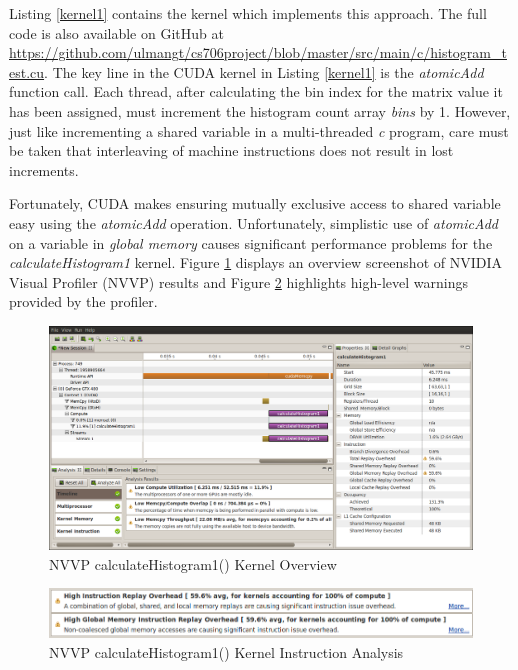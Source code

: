 \documentclass{article}
\begin{document}
Listing \ref{kernel1} contains the kernel which implements this approach. The full code is also available on GitHub at \url{https://github.com/ulmangt/cs706project/blob/master/src/main/c/histogram_test.cu}. The key line in the CUDA kernel in Listing \ref{kernel1} is the \emph{atomicAdd} function call. Each thread, after calculating the bin index for the matrix value it has been assigned, must increment the histogram count array \emph{bins} by 1. However, just like incrementing a shared variable in a multi-threaded \emph{c} program, care must be taken that interleaving of machine instructions does not result in lost increments.

Fortunately, CUDA makes ensuring mutually exclusive access to shared variable easy using the \emph{atomicAdd} operation\cite{arithmetic-functions}. Unfortunately, simplistic use of \emph{atomicAdd} on a variable in \emph{global memory} causes significant performance problems for the \emph{calculateHistogram1} kernel. Figure \ref{kernel1nvvp1} displays an overview screenshot of NVIDIA Visual Profiler (NVVP) results and Figure \ref{kernel1nvvp2} highlights high-level warnings provided by the profiler.

\begin{figure}
\centering
\includegraphics[width=1.0\textwidth]{screenshots/nvvp/calculateHistogram1_screen1.png}
\caption{NVVP calculateHistogram1() Kernel Overview }
\label{kernel1nvvp1}
\end{figure}

\begin{figure}
\centering
\includegraphics[width=1.0\textwidth]{screenshots/nvvp/calculateHistogram1_screen2.png}
\caption{NVVP calculateHistogram1() Kernel Instruction Analysis}
\label{kernel1nvvp2}
\end{figure}
\end{document}
